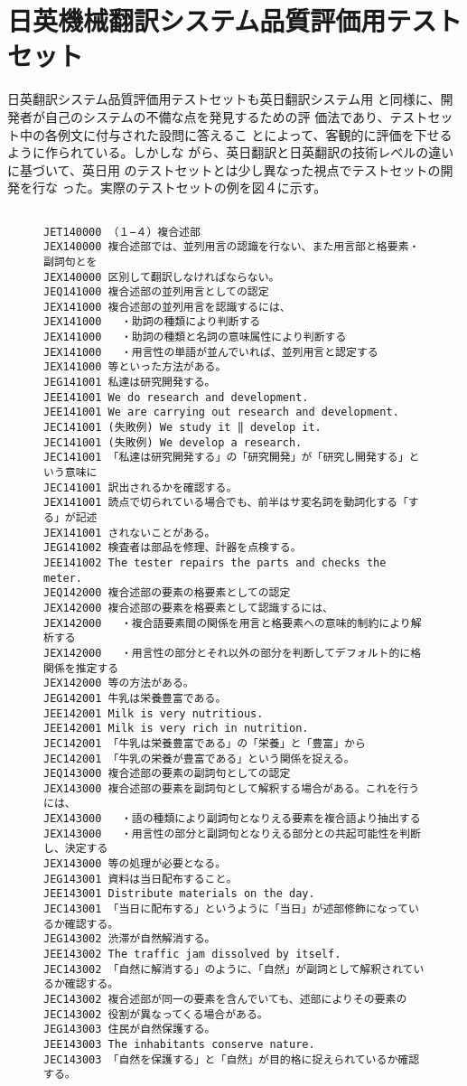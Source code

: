 \section{日英機械翻訳システム品質評価用テストセット}

日英翻訳システム品質評価用テストセットも英日翻訳システム用
と同様に、開発者が自己のシステムの不備な点を発見するための評
価法であり、テストセット中の各例文に付与された設問に答えるこ
とによって、客観的に評価を下せるように作られている。しかしな
がら、英日翻訳と日英翻訳の技術レベルの違いに基づいて、英日用
のテストセットとは少し異なった視点でテストセットの開発を行な
った。実際のテストセットの例を図４に示す。

\begin{figure}
\begin{small}
\begin{verbatim}

JET140000 （１−４）複合述部
JEX140000 複合述部では、並列用言の認識を行ない、また用言部と格要素・副詞句とを
JEX140000 区別して翻訳しなければならない。
JEQ141000 複合述部の並列用言としての認定
JEX141000 複合述部の並列用言を認識するには、
JEX141000   ・助詞の種類により判断する
JEX141000   ・助詞の種類と名詞の意味属性により判断する
JEX141000   ・用言性の単語が並んでいれば、並列用言と認定する
JEX141000 等といった方法がある。
JEG141001 私達は研究開発する。
JEE141001 We do research and development.
JEE141001 We are carrying out research and development.
JEC141001 (失敗例) We study it ‖ develop it.
JEC141001 (失敗例) We develop a research.
JEC141001 「私達は研究開発する」の「研究開発」が「研究し開発する」という意味に
JEC141001 訳出されるかを確認する。
JEX141001 読点で切られている場合でも、前半はサ変名詞を動詞化する「する」が記述
JEX141001 されないことがある。
JEG141002 検査者は部品を修理、計器を点検する。
JEE141002 The tester repairs the parts and checks the meter.
JEQ142000 複合述部の要素の格要素としての認定
JEX142000 複合述部の要素を格要素として認識するには、
JEX142000   ・複合語要素間の関係を用言と格要素への意味的制約により解析する
JEX142000   ・用言性の部分とそれ以外の部分を判断してデフォルト的に格関係を推定する
JEX142000 等の方法がある。
JEG142001 牛乳は栄養豊富である。
JEE142001 Milk is very nutritious.
JEE142001 Milk is very rich in nutrition.
JEC142001 「牛乳は栄養豊富である」の「栄養」と「豊富」から
JEC142001 「牛乳の栄養が豊富である」という関係を捉える。
JEQ143000 複合述部の要素の副詞句としての認定
JEX143000 複合述部の要素を副詞句として解釈する場合がある。これを行うには、
JEX143000   ・語の種類により副詞句となりえる要素を複合語より抽出する
JEX143000   ・用言性の部分と副詞句となりえる部分との共起可能性を判断し、決定する
JEX143000 等の処理が必要となる。
JEG143001 資料は当日配布すること。
JEE143001 Distribute materials on the day.
JEC143001 「当日に配布する」というように「当日」が述部修飾になっているか確認する。
JEG143002 渋滞が自然解消する。
JEE143002 The traffic jam dissolved by itself.
JEC143002 「自然に解消する」のように、「自然」が副詞として解釈されているか確認する。
JEC143002 複合述部が同一の要素を含んでいても、述部によりその要素の
JEC143002 役割が異なってくる場合がある。
JEG143003 住民が自然保護する。
JEE143003 The inhabitants conserve nature.
JEC143003 「自然を保護する」と「自然」が目的格に捉えられているか確認する。


\end{verbatim}
\end{small}
\end{figure}
